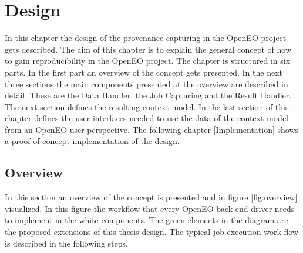\documentclass[draft,final]{vutinfth} %
\begin{document}
 
\chapter{Design}\label{Design}
In this chapter the design of the provenance capturing in the OpenEO project gets described. The aim of this chapter is to explain the general concept of how to gain reproducibility in the OpenEO project. The chapter is structured in six parts. In the first part an overview of the concept gets presented. In the next three sections the main components presented at the overview are described in detail. These are the Data Handler, the Job Capturing and the Result Handler. The next section defines the resulting context model. In the last section of this chapter defines the user interfaces needed to use the data of the context model from an OpenEO user perspective. The following chapter \ref{Implementation} shows a proof of concept implementation of the design. 


\section{Overview}\label{Design:Overview}
In this section an overview of the concept is presented and in figure \ref{fig:overview} visualized. In this figure the workflow that every OpenEO  back end driver needs to implement in the white components. The green elements in the diagram are the proposed extensions of this thesis design. The typical job execution work-flow is described in the following steps.
\end{document}

